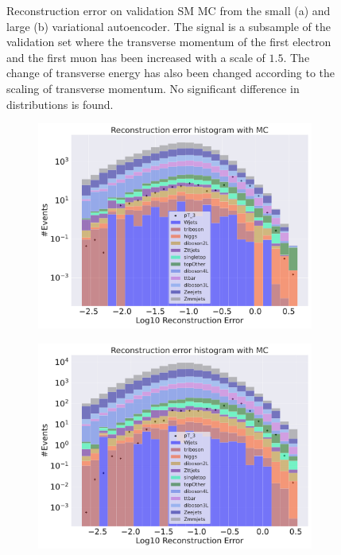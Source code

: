 \begin{figure}[H]
\begin{subfigure}{.45\textwidth}
        \caption{ }
        \label{fig:VAE_big_pt_1_5}
    \end{subfigure}
    \hfill 
    \caption[VAE |Reconstruction error $p_T$ altering of 1.5]{Reconstruction error on validation SM MC from the small (a) and large (b) variational autoencoder. The signal is a subsample of the validation 
    set where the transverse momentum of the first electron and the first muon has been increased with a scale of $1.5$. The change of transverse 
    energy has also been changed according to the scaling of transverse momentum. No significant difference in distributions is found. }
    \label{fig:VAE_big_small_pt_1_5}
\end{figure}

\begin{figure}[H]
    \centering
    \begin{subfigure}{.45\textwidth}
        \includegraphics[width=\textwidth]{Figures/VAE_testing/small/b_data_recon_big_rm3_feats_sig_pT_3.pdf}
        \caption{ }
        \label{fig:VAE_small_pt_3}
    \end{subfigure}
    \hfill 
    \begin{subfigure}{.45\textwidth}
        \includegraphics[width=\textwidth]{Figures/VAE_testing/big/b_data_recon_big_rm3_feats_sig_pT_3.pdf}

\end{subfigure}
\end{figure}
